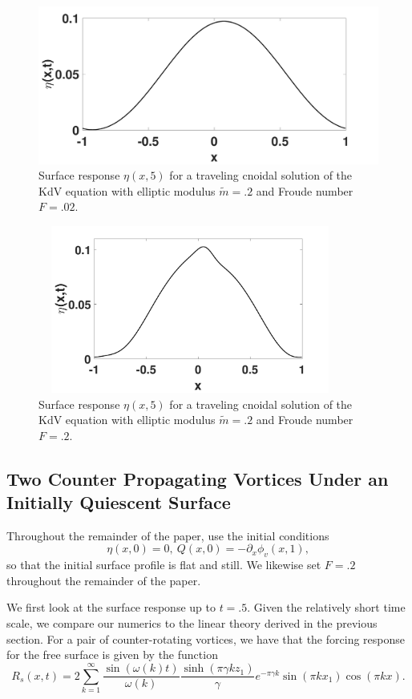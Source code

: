 \documentclass[a4paper,11pt]{article}
\newcommand{\p}{\partial}
\begin{document}
\begin{figure}[!h]
\centering
\includegraphics[width=.75\textwidth]{surf_resp_cnoid_mu_pt2_F_pt02_tf_5}
\caption{Surface response $\eta(x,5)$ for a traveling cnoidal solution of the KdV equation with elliptic modulus $\tilde{m}=.2$ and Froude number $F=.02$.}
\label{fig:surfrepcnwk}
\end{figure}
\begin{figure}[!h]
\centering
\includegraphics[width=10cm, height=5.5cm]{surf_resp_cnoid_mu_pt2_F_pt2_tf_5}
\caption{Surface response $\eta(x,5)$ for a traveling cnoidal solution of the KdV equation with elliptic modulus $\tilde{m}=.2$ and Froude number $F=.2$.}
\label{fig:surfrepcnstr}
\end{figure}

\subsection{Two Counter Propagating Vortices Under an Initially Quiescent Surface}
Throughout the remainder of the paper, use the initial conditions
\[
\eta(x,0) = 0, ~ Q(x,0) = -\p_{x}\phi_{v}(x,1),
\]
so that the initial surface profile is flat and still.  We likewise set $F=.2$ throughout the remainder of the paper.     

We first look at the surface response up to $t=.5$.  Given the relatively short time scale, we compare our numerics to the linear theory derived in the previous section.  For a pair of counter-rotating vortices, we have that the forcing response for the free surface is given by the function
\[
R_{s}(x,t) = 2\sum_{k=1}^{\infty} \frac{\sin(\omega(k)t)}{\omega(k)}\frac{\sinh(\pi \gamma k z_{1})}{\gamma}e^{-\pi \gamma k}\sin(\pi k x_{1})\cos(\pi k x).
\]
\end{document}
